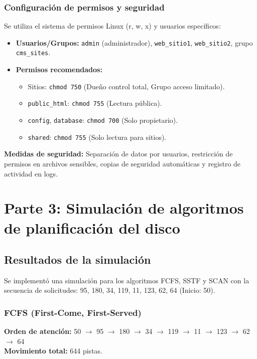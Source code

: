 \documentclass[stu, 12pt, letterpaper, donotrepeattitle, floatsintext, noapacite]{apa7}
\begin{document}
\subsubsection{Configuración de permisos y seguridad}
Se utiliza el sistema de permisos Linux (r, w, x) y usuarios específicos:
\begin{itemize}
    \item \textbf{Usuarios/Grupos:} \texttt{admin} (administrador), \texttt{web\_sitio1}, \texttt{web\_sitio2}, grupo \texttt{cms\_sites}.
    \item \textbf{Permisos recomendados:}
    \begin{itemize}
        \item Sitios: \texttt{chmod 750} (Dueño control total, Grupo acceso limitado).
        \item \texttt{public\_html}: \texttt{chmod 755} (Lectura pública).
        \item \texttt{config}, \texttt{database}: \texttt{chmod 700} (Solo propietario).
        \item \texttt{shared}: \texttt{chmod 755} (Solo lectura para sitios).
    \end{itemize}
\end{itemize}

\textbf{Medidas de seguridad:} Separación de datos por usuarios, restricción de permisos en archivos sensibles, copias de seguridad automáticas y registro de actividad en logs.

\section{Parte 3: Simulación de algoritmos de planificación del disco}

\subsection{Resultados de la simulación}
Se implementó una simulación para los algoritmos FCFS, SSTF y SCAN con la secuencia de solicitudes: 95, 180, 34, 119, 11, 123, 62, 64 (Inicio: 50).

\subsubsection{FCFS (First-Come, First-Served)}
\textbf{Orden de atención:} 50 $\rightarrow$ 95 $\rightarrow$ 180 $\rightarrow$ 34 $\rightarrow$ 119 $\rightarrow$ 11 $\rightarrow$ 123 $\rightarrow$ 62 $\rightarrow$ 64 \\
\textbf{Movimiento total:} 644 pistas.
\end{document}
